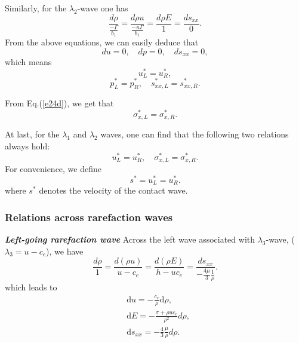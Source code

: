 \documentclass{article}
\numberwithin{equation}{section}
\numberwithin{table}{section}
\begin{document}
Similarly, for the $\lambda_{2}$-wave one
has
\begin{equation}   \label{e24a}
\frac{d \rho}{\frac{-\Gamma}{b_{1}}} = \frac{d \rho u}{\frac{-u
\Gamma}{b_{1}}}=\frac{d \rho E}{1} = \frac{d s_{xx}}{0}.
\end{equation}
From the above equations, we can easily deduce  that
\begin{equation}   \label{e24b}
du = 0, \quad dp=0, \quad ds_{xx}=0,
\end{equation}
 which means
\begin{equation}   \label{e24c}
  u_{L}^{\ast}=u_{R}^{\ast},
\end{equation}
\begin{equation}   \label{e24d}
p_{L}^{\ast}=p_{R}^{\ast}, \quad
  s_{xx,L}^{\ast}=s_{xx,R}^{\ast}.
\end{equation}


From  Eq.(\ref{e24d}), we  get that
\begin{equation}   \label{e27a}
\sigma_{x,L} ^{\ast}=  \sigma_{x,R} ^{\ast}.
\end{equation}


At last, for the $\lambda_{1}$ and $\lambda_{2}$ waves, one can find
that the following two relations always hold:
\begin{equation}   \label{e28}
u_{L}^{\ast}=u_{R}^{\ast}, \quad
\sigma_{x,L}^{\ast}=\sigma_{x,R}^{\ast}.
\end{equation}
For convenience, we define
\begin{equation}\label{eq:contact}
  s^* = u_L^* = u_R^*. %
\end{equation}
where $s^*$ denotes the velocity of the contact wave.

\subsubsection{Relations across rarefaction waves}\label{sec:rarefaction}

\emph{\textbf{Left-going rarefaction wave} }
Across the left wave associated with $\lambda_3$-wave, ($\lambda_3=u-c_e$), we have
\begin{equation}
  \frac{d\rho}{1} = \frac{d(\rho u)}{u-c_e} = \frac{d(\rho E)}{h-uc_e} = \frac{ds_{xx}}{-\frac{4\mu}{3}\frac{1}{\rho}}.
\end{equation}
which leads to
\begin{align}
  \label{eq:urho}
  & \text{d} u =-\frac{c_e}{\rho}\text{d}\rho,\\
 \label{eq:Erho}
  & \text{d} E = -\frac{\sigma+\rho u c_e}{\rho^2} d\rho,\\
\label{eq:sxxrho}
& \text{d} s_{xx} = -\frac{4}{3}\frac{\mu}{\rho} d\rho.
\end{align}
\end{document}
